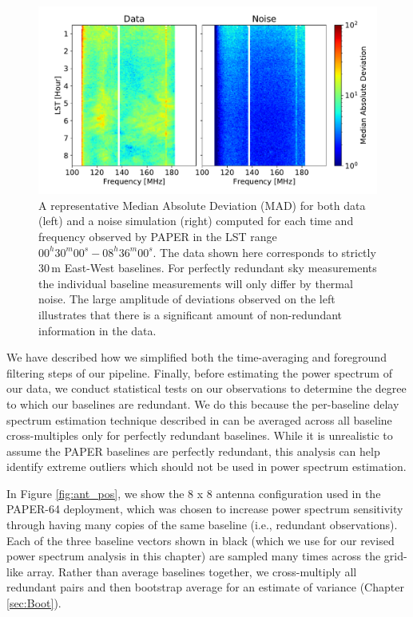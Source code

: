\begin{figure}[tp]
	\centering
	\includegraphics[width=.85\textwidth]{plots/data_noise_mad_O.pdf}
	\caption{A representative Median Absolute Deviation (MAD) for both data (left)
		and a noise simulation (right) computed for each time and frequency observed by
		PAPER in the LST range $00^{h}30^{m}00^{s} - 08^{h}36^{m}00^{s}$.
    The data shown here corresponds to
		strictly 30\,m East-West baselines.
		For perfectly redundant sky measurements the individual
		baseline measurements will only differ by thermal noise.
		The large amplitude of deviations observed on the left
		illustrates that there is a significant
		amount of non-redundant information in the data.}\label{fig:mad}
\end{figure}

We have described how we simplified both the time-averaging and foreground filtering steps of our pipeline. Finally, before estimating the power spectrum of our data, we conduct statistical tests on our observations to determine the degree to which
our baselines are redundant.
We do this because the per-baseline delay spectrum
estimation technique described in \citet{parsons_et_al2012b}
can be averaged across all baseline cross-multiples only for
perfectly redundant baselines. While it is unrealistic to assume
the PAPER baselines are perfectly redundant, this analysis can
help identify extreme outliers which should not be used in
power spectrum estimation.

In Figure \ref{fig:ant_pos}, we show the 8 x 8 antenna configuration used in the PAPER-64 deployment, which was chosen to increase power spectrum sensitivity through having many copies of the same baseline (i.e., redundant observations). Each of the three baseline vectors shown in black (which we use for our revised power spectrum analysis in this chapter) are
sampled many times across the grid-like array. Rather than average
baselines together,
we cross-multiply all redundant pairs and then bootstrap average for
an estimate of variance (Chapter \ref{sec:Boot}). 

